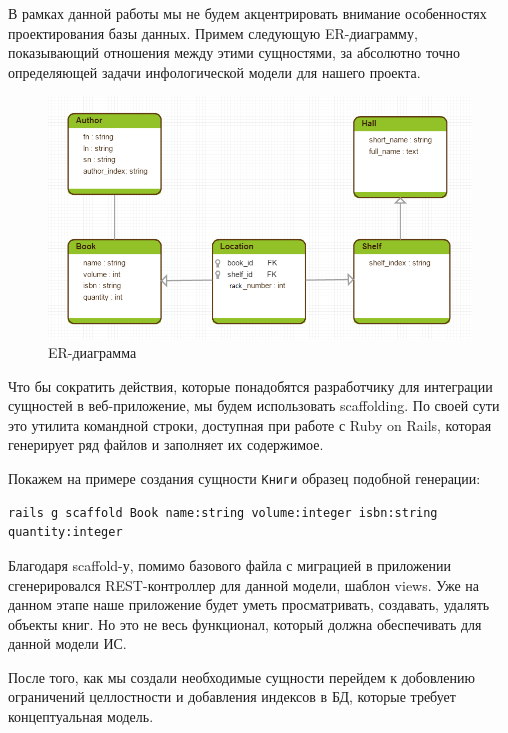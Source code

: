 В рамках данной работы мы не будем акцентрировать внимание особенностях проектирования базы данных.
Примем следующую ER-диаграмму, показывающий отношения между этими сущностями, за абсолютно точно
определяющей задачи инфологической модели для нашего проекта.

\newpage

\begin{figure}[ht!]
\begin{center}
\includegraphics[scale=0.6]{images/erdiagramm.png}
\end{center}
\vspace*{-8mm}
\caption{ER-диаграмма} \label{fig:erdiagramm}
\end{figure}

Что бы сократить действия, которые понадобятся разработчику для интеграции сущностей в веб-приложение, мы будем
использовать scaffolding. По своей сути это утилита командной строки, доступная при работе с Ruby on Rails, которая
генерирует ряд файлов и заполняет их содержимое.

Покажем на примере создания сущности \verb|Книги| образец подобной генерации:
\begin{small}
\begin{verbatim}
rails g scaffold Book name:string volume:integer isbn:string quantity:integer
\end{verbatim}
\end{small}

Благодаря scaffold-у, помимо базового файла с миграцией в приложении сгенерировался REST-контроллер
для данной модели, шаблон views. Уже на данном этапе наше приложение будет уметь просматривать, создавать,
удалять объекты книг. Но это не весь функционал, который должна обеспечивать для данной модели ИС.

После того, как мы создали необходимые сущности перейдем к добовлению ограничений
целлостности и добавления индексов в БД, которые требует концептуальная модель.

